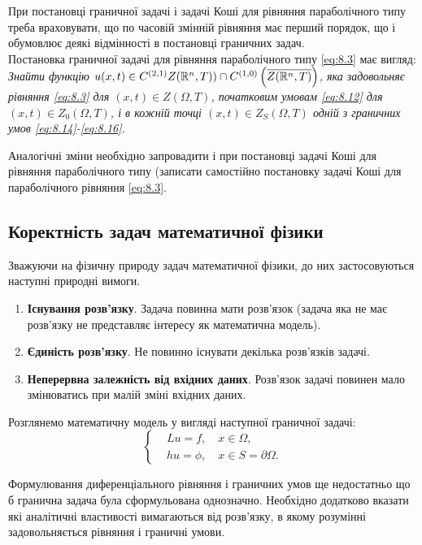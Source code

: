 При постановці граничної задачі і задачі Коші для рівняння параболічного типу треба враховувати, що по часовій змінній рівняння має перший порядок, що і обумовлює деякі відмінності в постановці граничних задач. \\

Постановка граничної задачі для рівняння параболічного типу \eqref{eq:8.3} має вигляд: \\

\textit{
	Знайти функцію $u(x, t) \in C^{(2, 1)}{Z(\mathbb{R}^n, T))} \cap C^{(1, 0)} \left( \overline{Z(\mathbb{R}^n, T)} \right)$, яка задовольняє рівняння \eqref{eq:8.3} для $(x, t) \in Z(\Omega, T)$, початковим умовам \eqref{eq:8.12} для $(x, t) \in Z_0(\Omega, T)$, і в кожній точці $(x, t) \in Z_S(\Omega, T)$ одній з граничних умов \eqref{eq:8.14}-\eqref{eq:8.16}.
}

Аналогічні зміни необхідно запровадити і при постановці задачі Коші для рівняння параболічного типу (записати самостійно постановку задачі Коші для параболічного рівняння \eqref{eq:8.3}.

\subsection{Коректність задач математичної фізики}

Зважуючи на фізичну природу задач математичної фізики, до них застосовуються наступні природні вимоги.
\begin{enumerate}
	\item \textbf{Існування розв'язку}. Задача повинна мати розв'язок (задача яка не має розв'язку не представляє інтересу як математична модель).
	\item \textbf{Єдиність розв'язку}. Не повинно існувати декілька розв'язків задачі.
	\item \textbf{Неперервна залежність від вхідних даних}. Розв'язок задачі повинен мало змінюватись при малій зміні вхідних даних.
\end{enumerate}

Розглянемо математичну модель у вигляді наступної граничної задачі:
\begin{equation}
	\label{eq:8.19}
	\left\{
		\begin{aligned}
			& L u = f, \quad x \in \Omega, \\
			& h u = \phi, \quad x \in S = \partial \Omega.
		\end{aligned}
	\right.
\end{equation}

Формулювання диференціального рівняння і граничних умов ще недостатньо що б гранична задача була сформульована однозначно. Необхідно додатково вказати які аналітичні властивості вимагаються від розв'язку, в якому розумінні задовольняється рівняння і граничні умови. \\


